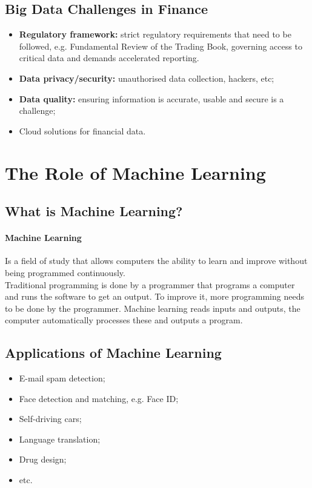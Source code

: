 \documentclass[11pt,a4paper]{report}
\begin{document}
\subsection{Big Data Challenges in Finance}
\begin{itemize}
    \item \textbf{Regulatory framework:} strict regulatory requirements that need to be followed, e.g. Fundamental Review of the Trading Book, governing access to critical data and demands accelerated reporting.
    \item \textbf{Data privacy/security:} unauthorised data collection, hackers, etc;
    \item \textbf{Data quality:} ensuring information is accurate, usable and secure is a challenge;
    \item Cloud solutions for financial data.
\end{itemize}

\section{The Role of Machine Learning}
\subsection{What is Machine Learning?}
\paragraph{Machine Learning} Is a field of study that allows computers the ability to learn and improve without being programmed continuously.
\\Traditional programming is done by a programmer that programs a computer and runs the software to get an output. To improve it, more programming needs to be done by the programmer.
Machine learning reads inputs and outputs, the computer automatically processes these and outputs a program.
\subsection{Applications of Machine Learning}
\begin{itemize}
    \item E-mail spam detection;
    \item Face detection and matching, e.g. Face ID;
    \item Self-driving cars;
    \item Language translation;
    \item Drug design;
    \item etc.
\end{itemize}
\end{document}
